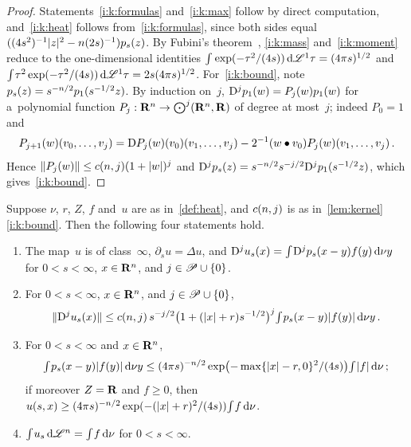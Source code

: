 \documentclass[a4paper,twoside,leqno]{article}
\begin{document}
\begin{proof}
    Statements~\ref{i:k:formulas} and~\ref{i:k:max} follow by direct computation,
    and~\ref{i:k:heat} follows from~\ref{i:k:formulas}, since both sides equal $((4s^2)^{-1}|z|^2
    - n (2s)^{-1}) p_s(z)$. By Fubini's theorem~\cite[2.6.2]{Federer1969}, \ref{i:k:mass}
    and~\ref{i:k:moment} reduce to the one-dimensional identities ${\textstyle\int_{}^{}} \exp(-\tau^2/(4s))
    \,\mathrm{d} \mathscr{L}^1 \tau = (4 \pi s)^{1/2}$ and ${\textstyle\int_{}^{}} \tau^2 \exp(-\tau^2/(4s)) \,\mathrm{d} \mathscr{L}^1 \tau =
    2s (4\pi s)^{1/2}$. For~\ref{i:k:bound}, note $p_s(z) = s^{-n/2} p_1(s^{-1/2} z)$. By
    induction on~$j$, $\mathrm{D}^j p_1(w) = P_j(w) p_1(w)$ for a~polynomial function $P_j : \mathbf{R}^{n}
    \to \textstyle\bigodot^j(\mathbf{R}^{n},\mathbf{R})$ of degree at most~$j$; indeed $P_0 = 1$ and
    \begin{displaymath}
        P_{j+1}(w)(v_0, \ldots, v_j) = \mathrm{D} P_j(w)(v_0)(v_1, \ldots, v_j) - 2^{-1} (w \bullet v_0)
        P_j(w)(v_1, \ldots, v_j) \,.
    \end{displaymath}
    Hence $\|P_j(w)\| \le c(n,j)(1 + |w|)^j$ and $\mathrm{D}^j p_s(z) =
    s^{-n/2} s^{-j/2} \mathrm{D}^j p_1(s^{-1/2} z)$, which gives~\ref{i:k:bound}.
\end{proof}

\begin{lemma}
    \label{lem:heat_extension}
    Suppose $\nu$, $r$, $Z$, $f$ and~$u$ are as in~\ref{def:heat}, and $c(n,j)$ is as
    in~\ref{lem:kernel}\ref{i:k:bound}. Then the following four statements hold.
    \begin{enumerate}
        \item \label{i:he:smooth} The map~$u$ is of class~$\infty$, $\partial_s u = \Delta u$, and
        $\mathrm{D}^j u_s(x) = {\textstyle\int_{}^{}} \mathrm{D}^j p_s(x-y) f(y) \,\mathrm{d} \nu y$ for $0 < s < \infty$, $x \in
        \mathbf{R}^{n}$, and $j \in \mathscr{P} \cup \{0\}$.
        \item \label{i:he:bound} For $0 < s < \infty$, $x \in \mathbf{R}^{n}$, and $j \in \mathscr{P} \cup \{0\}$,
        \begin{displaymath}
            \|\mathrm{D}^j u_s(x)\| \le c(n,j) \, s^{-j/2} \bigl( 1 + (|x| + r) s^{-1/2} \bigr)^j
            {\textstyle\int_{}^{}} p_s(x-y) |f(y)| \,\mathrm{d} \nu y \,.
        \end{displaymath}
        \item \label{i:he:gauss} For $0 < s < \infty$ and $x \in \mathbf{R}^{n}$,
        \begin{displaymath}
            {\textstyle\int_{}^{}} p_s(x-y) |f(y)| \,\mathrm{d} \nu y \le (4 \pi s)^{-n/2} \exp \bigl(
            - \max \{ |x| - r, 0 \}^2 / (4s) \bigr) {\textstyle\int_{}^{}} |f| \,\mathrm{d} \nu \,;
        \end{displaymath}
        if moreover $Z = \mathbf{R}$ and $f \ge 0$, then $u(s,x) \ge (4 \pi s)^{-n/2} \exp(-(|x| +
        r)^2/(4s)) {\textstyle\int_{}^{}} f \,\mathrm{d} \nu$.
        \item \label{i:he:mass} ${\textstyle\int_{}^{}} u_s \,\mathrm{d} \mathscr{L}^{n} = {\textstyle\int_{}^{}} f \,\mathrm{d} \nu$ for $0
        < s < \infty$.
    \end{enumerate}
\end{lemma}
\end{document}
